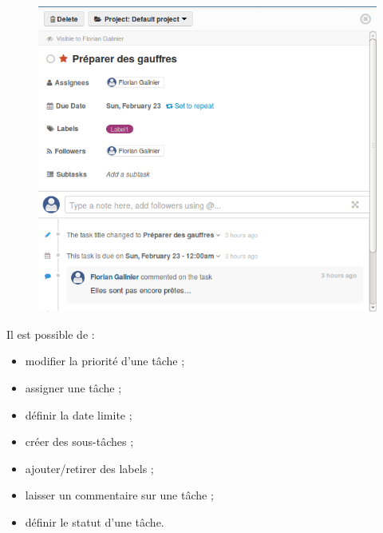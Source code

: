\begin{frame}[allowframebreaks]
  \begin{figure}
    \includegraphics[scale=0.40]{img/taches.png}
  \end{figure}

\framebreak

Il est possible de : 
  \begin{itemize}
    \item modifier la priorité d'une tâche ;
    \item assigner une tâche ;
    \item définir la date limite ;
    \item créer des sous-tâches ;
    \item ajouter/retirer des labels ;
    \item laisser un commentaire sur une tâche ;
    \item définir le statut d'une tâche.
  \end{itemize}
\end{frame}
